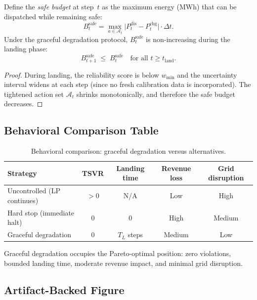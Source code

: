 \begin{proposition}
\label{prop:budget-monotonicity}
Define the \emph{safe budget} at step~$t$ as the maximum energy
(MWh) that can be dispatched while remaining safe:
\[
  B_t^{\text{safe}} = \max_{a \in \mathcal{A}_t}
  \bigl|P_t^{\text{dis}} - P_t^{\text{chg}}\bigr| \cdot \Delta t.
\]
Under the graceful degradation protocol,
$B_t^{\text{safe}}$ is non-increasing during the landing phase:
\[
  B_{t+1}^{\text{safe}} \;\le\; B_t^{\text{safe}}
  \quad\text{for all } t \ge t_{\text{land}}.
\]
\end{proposition}

\begin{proof}
During landing, the reliability score is below $w_{\min}$ and the
uncertainty interval widens at each step (since no fresh calibration
data is incorporated).  The tightened action set $\mathcal{A}_t$
shrinks monotonically, and therefore the safe budget decreases.
\end{proof}

\subsection{Behavioral Comparison Table}

\begin{table}[ht]
\centering
\caption{Behavioral comparison: graceful degradation versus alternatives.}
\label{tab:behavioral-comparison}
\begin{tabular}{lcccc}
\toprule
\textbf{Strategy} & \textbf{TSVR} & \textbf{Landing time} &
  \textbf{Revenue loss} & \textbf{Grid disruption} \\
\midrule
Uncontrolled (LP continues) & $> 0$ & N/A & Low & High \\
Hard stop (immediate halt) & 0 & 0 & High & Medium \\
Graceful degradation & 0 & $T_L$ steps & Medium & Low \\
\bottomrule
\end{tabular}
\end{table}

Graceful degradation occupies the Pareto-optimal position: zero
violations, bounded landing time, moderate revenue impact, and
minimal grid disruption.

\subsection{Artifact-Backed Figure}

